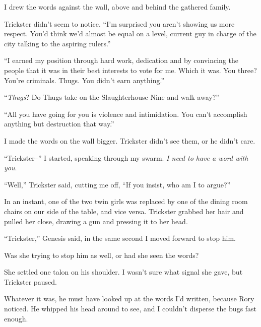 I drew the words against the wall, above and behind the gathered family.



Trickster didn't seem to notice.  ``I'm surprised you aren't showing us more respect.  You'd think we'd almost be equal on a level, current guy in charge of the city talking to the aspiring rulers.''



``I earned my position through hard work, dedication and by convincing the people that it was in their best interests to vote for me.  Which it was.  You three?  You're criminals.  Thugs.  You didn't earn anything.''



``\emph{Thugs}?  Do Thugs take on the Slaughterhouse Nine and walk away?''



``All you have going for you is violence and intimidation.  You can't accomplish anything but destruction that way.''



I made the words on the wall bigger.  Trickster didn't see them, or he didn't care.



``Trickster--'' I started, speaking through my swarm.  \emph{I need to have a word with you}.



``Well,'' Trickster said, cutting me off, ``If you insist, who am I to argue?''



In an instant, one of the two twin girls was replaced by one of the dining room chairs on our side of the table, and vice versa.  Trickster grabbed her hair and pulled her close, drawing a gun and pressing it to her head.



``Trickster,'' Genesis said, in the same second I moved forward to stop him.



Was she trying to stop him as well, or had she seen the words?



She settled one talon on his shoulder.  I wasn't sure what signal she gave, but Trickster paused.



Whatever it was, he must have looked up at the words I'd written, because Rory noticed.  He whipped his head around to see, and I couldn't disperse the bugs fast enough.



